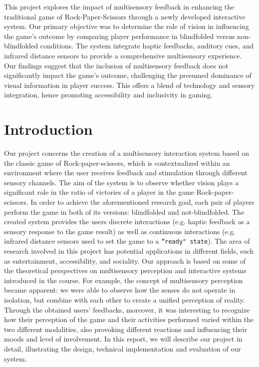 \documentclass[11pt,a4paper]{report}
\begin{document}
This project explores the impact of multisensory feedback in enhancing the traditional game of Rock-Paper-Scissors through a newly developed interactive system. Our primary objective was to determine the role of vision in influencing the game's outcome by comparing player performance in blindfolded versus non-blindfolded conditions. The system integrate haptic feedbacks, auditory cues, and infrared distance sensors to provide a comprehensive multisensory experience.
Our findings suggest that the inclusion of multisensory feedback does not significantly impact the game's outcome, challenging the presumed dominance of visual information in player success. This offers a blend of technology and sensory integration, hence promoting accessibility and inclusivity in gaming.

\section*{Introduction}
Our project concerns the creation of a multisensory interaction system based on the classic game of Rock-paper-scissors, which is contextualized within an environment where the user receives feedback and stimulation through different sensory channels. The aim of the system is to observe whether vision plays a significant role in the ratio of victories of a player in the game Rock-paper-scissors. In order to achieve the aforementioned research goal, each pair of players perform the game in both of its versions: blindfolded and not-blindfolded. 
The created system provides the users discrete interactions (e.g. haptic feedback as a sensory response to the game result) as well as continuous interactions (e.g. infrared distance sensors used to set the game to a \texttt{“ready" state}).
The area of research involved in this project has potential applications in different fields, such as entertainment, accessibility, and sociality.
Our approach is based on some of the theoretical perspectives on multisensory perception and interactive systems introduced in the course.
For example, the concept of multisensory perception became apparent: we were able to observe how the senses do not operate in isolation, but combine with each other to create a unified perception of reality.
Through the obtained users' feedbacks, moreover, it was interesting to recognize how their perception of the game and their activities performed varied within the two different modalities, also provoking different reactions and influencing their moods and level of involvement.
In this report, we will describe our project in detail, illustrating the design, technical implementation and evaluation of our system.
\end{document}
